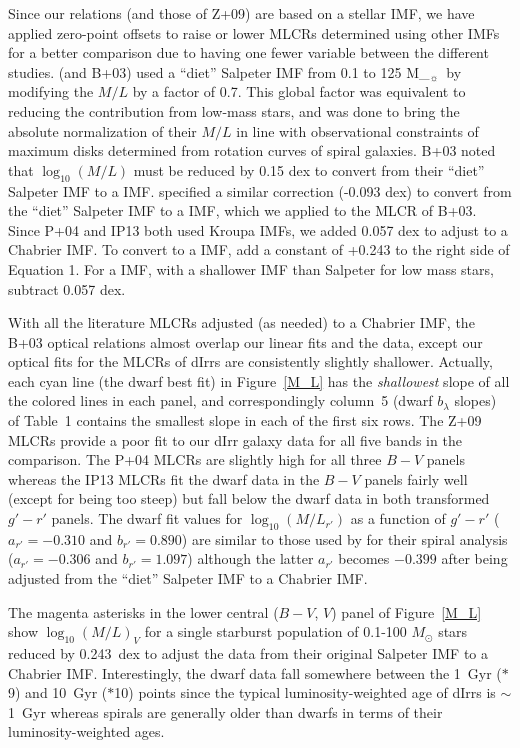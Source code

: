 \documentclass[12pt]{emulateapj}
\newcommand{\solar}{\ifmmode_{\sun}\else$_{\sun}$\fi}
\begin{document}
Since our relations (and those of Z+09) are based on a \citet{c03} stellar IMF, we have applied zero-point offsets to raise or lower MLCRs determined using other IMFs for a better comparison due to having one fewer variable between the different studies. \citet{bdj01} (and B+03) used a ``diet'' Salpeter IMF from 0.1 to 125 M\solar\ by modifying the $M/L$ by a factor of 0.7. This global factor was equivalent to reducing the contribution from low-mass stars, and was done to bring the absolute normalization of their $M/L$ in line with observational constraints of maximum disks determined from rotation curves of spiral galaxies. B+03 noted that $\log_{10} (M/L)$ must be reduced by 0.15 dex to convert from their ``diet'' Salpeter IMF to a \citet{k01} IMF.  \citet{g+08} specified a similar correction (-0.093 dex) to convert from the ``diet'' Salpeter IMF to a \citet{c03} IMF, which we applied to the MLCR of B+03. Since P+04 and IP13 both used Kroupa IMFs, we added 0.057 dex to adjust to a Chabrier IMF. To convert to a \citet{salpeter55} IMF, add a constant of +0.243 to the right side of Equation 1. For a \citet{k01} IMF, with a shallower IMF than Salpeter for low mass stars, subtract 0.057 dex. 

With all the literature MLCRs adjusted (as needed) to a Chabrier IMF, the B+03 optical relations almost overlap our linear fits and the data, except our optical fits for the MLCRs of dIrrs are consistently slightly shallower.  Actually, each cyan line (the dwarf best fit) in Figure~\ref{M_L} has the {\it shallowest} slope of all the colored lines in each panel, and correspondingly column~5 (dwarf $b_{\lambda}$ slopes) of Table~1 contains the smallest slope in each of the first six rows.  The Z+09 MLCRs provide a poor fit to our dIrr galaxy data for all five bands in the comparison.  The P+04 MLCRs are slightly high for all three $B-V$ panels whereas the IP13 MLCRs fit the dwarf data in the $B-V$ panels fairly well (except for being too steep) but fall below the dwarf data in both transformed $g'-r'$ panels.  The dwarf fit values for $\log_{10} (M/L_{r'})$ as a function of $g'-r'$ ($a_{r'} = -0.310$ and $b_{r'} = 0.890$) are similar to those used by \citet{btp08} for their spiral analysis ($a_{r'} = -0.306$ and $b_{r'} = 1.097$) although the latter $a_{r'}$ becomes $-0.399$ after being adjusted from the ``diet'' Salpeter IMF to a Chabrier IMF.

The magenta asterisks in the lower central ($B-V$, $V$) panel of Figure~\ref{M_L} show $\log_{10}(M/L)_V$ for a single starburst population of 0.1-100 $M_{\odot}$ stars \citep{bc03} reduced by 0.243~dex to adjust the data from their original Salpeter IMF to a Chabrier IMF.  Interestingly, the dwarf data fall somewhere between the 1~Gyr ($\ast$9) and 10~Gyr ($\ast$10) points since the typical luminosity-weighted age of dIrrs is $\sim$1~Gyr whereas spirals are generally older than dwarfs in terms of their luminosity-weighted ages.
\end{document}
